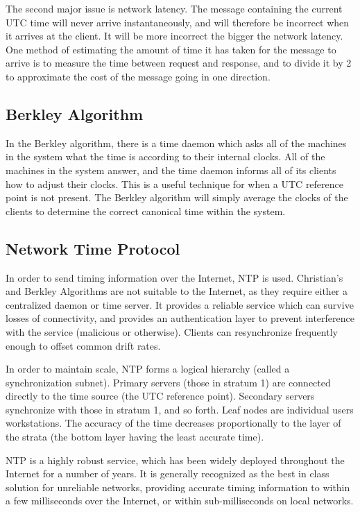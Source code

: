 \documentclass{article}
\begin{document}
The second major issue is network latency. The message containing the current UTC time will never arrive instantaneously, and will therefore be incorrect when it arrives at the client. It will be more incorrect the bigger the network latency. One method of estimating the amount of time it has taken for the message to arrive is to measure the time between request and response, and to divide it by 2 to approximate the cost of the message going in one direction. 

\subsection{Berkley Algorithm}
In the Berkley algorithm, there is a time daemon which asks all of the machines in the system what the time is according to their internal clocks. All of the machines in the system answer, and the time daemon informs all of its clients how to adjust their clocks. This is a useful technique for when a UTC reference point is not present. The Berkley algorithm will simply average the clocks of the clients to determine the correct canonical time within the system.

\subsection{Network Time Protocol}
In order to send timing information over the Internet, NTP is used. Christian's and Berkley Algorithms are not suitable to the Internet, as they require either a centralized daemon or time server. It provides a reliable service which can survive losses of connectivity, and provides an authentication layer to prevent interference with the service (malicious or otherwise). Clients can resynchronize frequently enough to offset common drift rates.

In order to maintain scale, NTP forms a logical hierarchy (called a synchronization subnet). Primary servers (those in stratum 1) are connected directly to the time source (the UTC reference point). Secondary servers synchronize with those in stratum 1, and so forth. Leaf nodes are individual users workstations. The accuracy of the time decreases proportionally to the layer of the strata (the bottom layer having the least accurate time). 

NTP is a highly robust service, which has been widely deployed throughout the Internet for a number of years. It is generally recognized as the best in class solution for unreliable networks, providing accurate timing information to within a few milliseconds over the Internet, or within sub-milliseconds on local networks.
\end{document}
